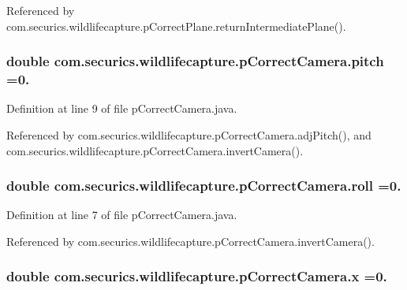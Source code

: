 Referenced by com.\+securics.\+wildlifecapture.\+p\+Correct\+Plane.\+return\+Intermediate\+Plane().

\hypertarget{classcom_1_1securics_1_1wildlifecapture_1_1p_correct_camera_a5820d360116f608a4a47416558370931}{
\subsubsection[{pitch}]{\setlength{\rightskip}{0pt plus 5cm}double com.\+securics.\+wildlifecapture.\+p\+Correct\+Camera.\+pitch =0.}}\label{classcom_1_1securics_1_1wildlifecapture_1_1p_correct_camera_a5820d360116f608a4a47416558370931}


Definition at line 9 of file p\+Correct\+Camera.\+java.



Referenced by com.\+securics.\+wildlifecapture.\+p\+Correct\+Camera.\+adj\+Pitch(), and com.\+securics.\+wildlifecapture.\+p\+Correct\+Camera.\+invert\+Camera().

\hypertarget{classcom_1_1securics_1_1wildlifecapture_1_1p_correct_camera_ade8c732e97e38b958251da7e4f6cd9b9}{
\subsubsection[{roll}]{\setlength{\rightskip}{0pt plus 5cm}double com.\+securics.\+wildlifecapture.\+p\+Correct\+Camera.\+roll =0.}}\label{classcom_1_1securics_1_1wildlifecapture_1_1p_correct_camera_ade8c732e97e38b958251da7e4f6cd9b9}


Definition at line 7 of file p\+Correct\+Camera.\+java.



Referenced by com.\+securics.\+wildlifecapture.\+p\+Correct\+Camera.\+invert\+Camera().

\hypertarget{classcom_1_1securics_1_1wildlifecapture_1_1p_correct_camera_a46846caddb75b48e6b53eb3891e29b23}{
\subsubsection[{x}]{\setlength{\rightskip}{0pt plus 5cm}double com.\+securics.\+wildlifecapture.\+p\+Correct\+Camera.\+x =0.}}\label{classcom_1_1securics_1_1wildlifecapture_1_1p_correct_camera_a46846caddb75b48e6b53eb3891e29b23}


